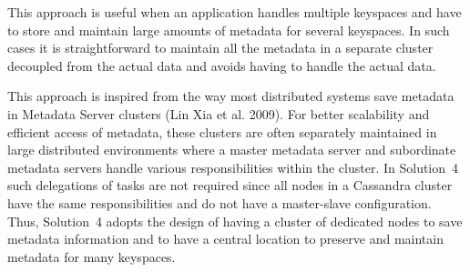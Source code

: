 This  approach is useful when an application handles multiple keyspaces
and have to store and maintain large amounts of metadata  for  several
keyspaces. 
In such cases it is straightforward  to maintain all the metadata  in a
separate cluster  decoupled from the actual data and avoids having to handle
the actual data. 
 
 This approach is inspired from the way most distributed systems save metadata
 in Metadata Server clusters (Lin Xia et al.  2009).
 For better scalability and efficient access of metadata,  these clusters are
 often separately maintained in large distributed environments where a master
 metadata server and subordinate metadata servers handle various
 responsibilities within the cluster.
 In Solution~4 such delegations of tasks are not required since all nodes in a
 Cassandra cluster  have the same responsibilities and do not have a
 master-slave configuration.  Thus, Solution~4  adopts the design of having
 a cluster of dedicated nodes to save metadata information and to have a central
 location to preserve and maintain metadata for many keyspaces.
 